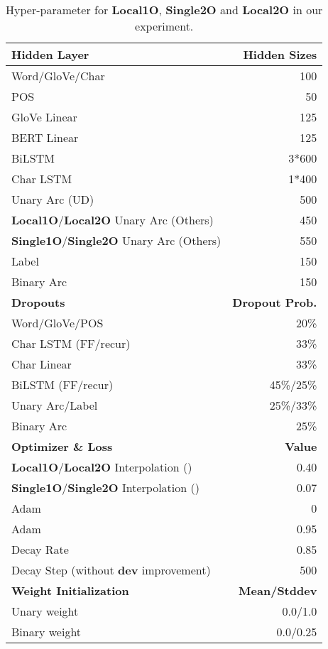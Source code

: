 \documentclass[11pt,a4paper]{article}
\begin{document}
\begin{table}[t!]
\small
\begin{center}
\begin{tabular}{lr}
\hline \hline
\textbf{Hidden Layer} & \textbf{Hidden Sizes}\\ \hline
Word/GloVe/Char & 100\\
POS & 50 \\
GloVe Linear & 125 \\
BERT Linear & 125 \\
BiLSTM & 3*600 \\
Char LSTM & 1*400 \\
Unary Arc (UD) & 500\\
\textbf{Local1O}/\textbf{Local2O} Unary Arc (Others) & 450\\
\textbf{Single1O}/\textbf{Single2O} Unary Arc (Others) & 550\\
Label & 150\\
Binary Arc & 150\\
\hline \textbf{Dropouts} & \textbf{Dropout Prob.}\\ \hline
Word/GloVe/POS & 20\%\\
Char LSTM (FF/recur) & 33\%\\
Char Linear & 33\%\\
BiLSTM (FF/recur) & 45\%/25\%\\
Unary Arc/Label & 25\%/33\%\\
Binary Arc & 25\%\\
\hline \textbf{Optimizer \& Loss} & \textbf{Value}\\ \hline
\textbf{Local1O}/\textbf{Local2O} Interpolation ()& 0.40\\
\textbf{Single1O}/\textbf{Single2O} Interpolation ()& 0.07\\
Adam  & 0\\
Adam  & 0.95\\
Decay Rate & 0.85 \\
Decay Step (without \textbf{dev} improvement) & 500 \\
\hline
\textbf{Weight Initialization} & \textbf{Mean/Stddev}\\
\hline
Unary weight & 0.0/1.0\\
Binary weight & 0.0/0.25\\
\hline \hline
\end{tabular}
\end{center}
\caption{Hyper-parameter for \textbf{Local1O}, \textbf{Single2O} and \textbf{Local2O} in our experiment. }
\label{tab:hyper}
\end{table}
\end{document}
